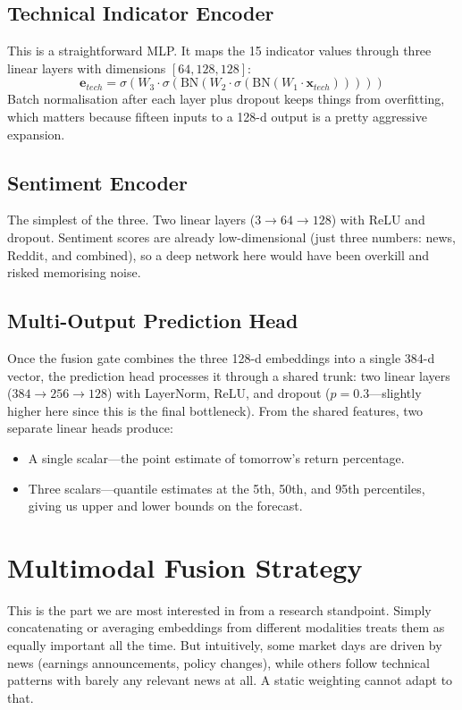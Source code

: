 \documentclass[conference]{IEEEtran}
\begin{document}
\subsection{Technical Indicator Encoder}
This is a straightforward MLP. It maps the 15 indicator values through three linear layers with dimensions $[64, 128, 128]$:
\begin{equation}
\mathbf{e}_{tech} = \sigma(W_3 \cdot \sigma(\text{BN}(W_2 \cdot \sigma(\text{BN}(W_1 \cdot \mathbf{x}_{tech})))))
\end{equation}
Batch normalisation after each layer plus dropout keeps things from overfitting, which matters because fifteen inputs to a 128-d output is a pretty aggressive expansion.

\subsection{Sentiment Encoder}
The simplest of the three. Two linear layers ($3 \rightarrow 64 \rightarrow 128$) with ReLU and dropout. Sentiment scores are already low-dimensional (just three numbers: news, Reddit, and combined), so a deep network here would have been overkill and risked memorising noise.

\subsection{Multi-Output Prediction Head}
Once the fusion gate combines the three 128-d embeddings into a single 384-d vector, the prediction head processes it through a shared trunk: two linear layers ($384 \rightarrow 256 \rightarrow 128$) with LayerNorm, ReLU, and dropout ($p = 0.3$---slightly higher here since this is the final bottleneck). From the shared features, two separate linear heads produce:
\begin{itemize}
\item A single scalar---the point estimate of tomorrow's return percentage.
\item Three scalars---quantile estimates at the 5th, 50th, and 95th percentiles, giving us upper and lower bounds on the forecast.
\end{itemize}

\section{Multimodal Fusion Strategy}
This is the part we are most interested in from a research standpoint. Simply concatenating or averaging embeddings from different modalities treats them as equally important all the time. But intuitively, some market days are driven by news (earnings announcements, policy changes), while others follow technical patterns with barely any relevant news at all. A static weighting cannot adapt to that.
\end{document}
